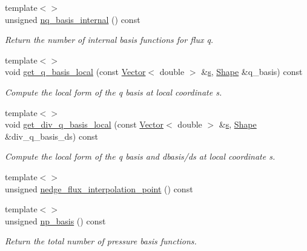 \begin{DoxyCompactItemize}
{\footnotesize template$<$$>$ }\\unsigned \hyperlink{classoomph_1_1TAxisymmetricPoroelasticityElement_a3044d14c97b11bc95560356dfb684a4b}{nq\+\_\+basis\+\_\+internal} () const
\begin{DoxyCompactList}\small\item\em Return the number of internal basis functions for flux q. \end{DoxyCompactList}\item 
{\footnotesize template$<$$>$ }\\void \hyperlink{classoomph_1_1TAxisymmetricPoroelasticityElement_ad6ac37a3eabec3e5aab6e7c2e7d65b4e}{get\+\_\+q\+\_\+basis\+\_\+local} (const \hyperlink{classoomph_1_1Vector}{Vector}$<$ double $>$ \&\hyperlink{cfortran_8h_ab7123126e4885ef647dd9c6e3807a21c}{s}, \hyperlink{classoomph_1_1Shape}{Shape} \&q\+\_\+basis) const
\begin{DoxyCompactList}\small\item\em Compute the local form of the q basis at local coordinate s. \end{DoxyCompactList}\item 
{\footnotesize template$<$$>$ }\\void \hyperlink{classoomph_1_1TAxisymmetricPoroelasticityElement_a8099e78155f0a3a042b57e35756847e1}{get\+\_\+div\+\_\+q\+\_\+basis\+\_\+local} (const \hyperlink{classoomph_1_1Vector}{Vector}$<$ double $>$ \&\hyperlink{cfortran_8h_ab7123126e4885ef647dd9c6e3807a21c}{s}, \hyperlink{classoomph_1_1Shape}{Shape} \&div\+\_\+q\+\_\+basis\+\_\+ds) const
\begin{DoxyCompactList}\small\item\em Compute the local form of the q basis and dbasis/ds at local coordinate s. \end{DoxyCompactList}\item 
{\footnotesize template$<$$>$ }\\unsigned \hyperlink{classoomph_1_1TAxisymmetricPoroelasticityElement_ac7e51a2a3dae948df106d34fe6fe6e29}{nedge\+\_\+flux\+\_\+interpolation\+\_\+point} () const
\item 
{\footnotesize template$<$$>$ }\\unsigned \hyperlink{classoomph_1_1TAxisymmetricPoroelasticityElement_ab0ba7323f782f19c961bb5ccec22aea3}{np\+\_\+basis} () const
\begin{DoxyCompactList}\small\item\em Return the total number of pressure basis functions. \end{DoxyCompactList}\item 

\end{DoxyCompactItemize}
